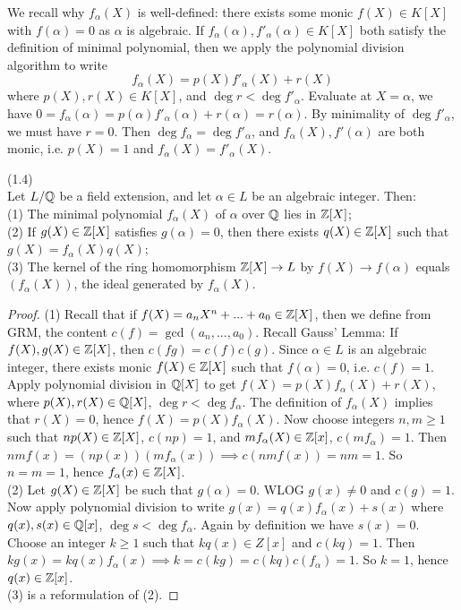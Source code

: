 \documentclass[a4paper]{article}
\begin{document}
We recall why $f_\alpha(X)$ is well-defined: there exists some monic $f(X) \in K[X]$ with $f(\alpha)=0$ as $\alpha$ is algebraic. If $f_\alpha(\alpha),f'_\alpha(\alpha) \in K[X]$ both satisfy the definition of minimal polynomial, then we apply the polynomial division algorithm to write $$f_\alpha(X) = p(X) f'_\alpha(X) + r(X)$$ where $p(X),r(X) \in K[X]$, and $\deg r < \deg f'_\alpha$. Evaluate at $X=\alpha$, we have $0=f_\alpha(\alpha) = p(\alpha)f'_\alpha(\alpha)+r(\alpha)=r(\alpha)$. By minimality of $\deg f'_\alpha$, we must have $r=0$. Then $\deg f_\alpha = \deg f'_\alpha$, and $f_\alpha(X),f'(\alpha)$ are both monic, i.e. $p(X) = 1$ and $f_\alpha(X) = f'_\alpha(X)$.

\begin{lemma}(1.4)\\
Let $L/\mathbb{Q}$ be a field extension, and let $\alpha \in L$ be an algebraic integer. Then:\\
(1) The minimal polynomial $f_\alpha(X)$ of $\alpha$ over $\mathbb{Q}$ lies in $\mathbb{Z}[X]$;\\
(2) If $g(X) \in \mathbb{Z}[X]$ satisfies $g(\alpha) = 0$, then there exists $q(X) \in \mathbb{Z}[X]$ such that $g(X) = f_\alpha(X) q(X)$;\\
(3) The kernel of the ring homomorphism $\mathbb{Z}[X] \to L$ by $f(X) \to f(\alpha)$ equals $(f_\alpha(X))$, the ideal generated by $f_\alpha(X)$.
\begin{proof}
(1) Recall that if $f(X) = a_n X^n + ... + a_0 \in \mathbb{Z}[X]$, then we define from GRM, the content $c(f) = \gcd(a_n,...,a_0)$. Recall Gauss' Lemma: If $f(X), g(X) \in \mathbb{Z}[X]$, then $c(fg) = c(f)c(g)$. Since $\alpha \in L$ is an algebraic integer, there exists monic $f(X) \in \mathbb{Z}[X]$ such that $f(\alpha) = 0$, i.e. $c(f) = 1$. Apply polynomial division in $\mathbb{Q}[X]$ to get $f(X) = p(X) f_\alpha(X) +r(X)$, where $p(X),r(X) \in \mathbb{Q}[X]$, $\deg r < \deg f_\alpha$. The definition of $f_\alpha(X)$ implies that $r(X) = 0$, hence $f(X) = p(X) f_\alpha(X)$. Now choose integers $n,m \geq 1$ such that $np(X) \in \mathbb{Z}[X]$, $c(np) = 1$, and $mf_\alpha(X) \in \mathbb{Z}[x]$, $c(mf_\alpha) = 1$. Then $nmf(x) = (np(x))(mf_\alpha(x)) \implies c(nmf(x)) = nm = 1$. So $n=m=1$, hence $f_\alpha(x) \in \mathbb{Z}[X]$.\\
(2) Let $g(X) \in \mathbb{Z}[X]$ be such that $g(\alpha) =0 $. WLOG $g(x) \neq 0$ and $c(g) = 1$. Now apply polynomial division to write $g(x) = q(x) f_\alpha(x) + s(x)$ where $q(x),s(x) \in \mathbb{Q}[x]$, $\deg s < \deg f_\alpha$. Again by definition we have $s(x) = 0$. Choose an integer $k \geq 1$ such that $kq(x) \in Z[x]$ and $c(kq) =1$. Then $kg(x) = kq(x) f_\alpha(x) \implies k=c(kg) = c(kq) c(f_\alpha) = 1$. So $k=1$, hence $q(x) \in \mathbb{Z}[x]$.\\
(3) is a reformulation of (2).
\end{proof}
\end{lemma}
\end{document}
